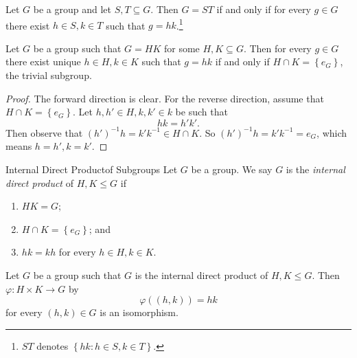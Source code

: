 \documentclass[pmath347]{subfiles}
\begin{document}
    \clearpage
    \begin{prop}{}
        Let $G$ be a group and let $S,T\subseteq G$. Then $G=ST$ if and only if for every $g\in G$ there exist $h\in S, k\in T$ such that $g=hk$.\footnote{$ST$ denotes $\left\lbrace hk:h\in S, k\in T \right\rbrace$.}
    \end{prop}

    \begin{prop}{}
        Let $G$ be a group such that $G=HK$ for some $H,K\subseteq G$. Then for every $g\in G$ there exist unique $h\in H,k\in K$ such that $g=hk$ if and only if $H\cap K = \left\lbrace e_G \right\rbrace$, the trivial subgroup.
    \end{prop}
    
    \begin{proof}
        The forward direction is clear. For the reverse direction, assume that $H\cap K = \left\lbrace e_G \right\rbrace$. Let $h,h'\in H, k,k'\in k$ be such that
        \begin{equation*}
            hk = h'k'.
        \end{equation*}
        Then observe that $\left( h' \right) ^{-1} h = k'k^{-1} \in H\cap K$. So $\left( h' \right) ^{-1} h = k'k^{-1} = e_G$, which means $h=h', k=k'$.
    \end{proof}
    
    \begin{definition}{Internal Direct Product}{of Subgroups}
        Let $G$ be a group. We say $G$ is the \emph{internal direct product} of $H,K\leq G$ if
        \begin{enumerate}
            \item $HK=G$;
            \item $H\cap K=\left\lbrace e_G \right\rbrace$; and
            \item $hk=kh$ for every $h\in H, k\in K$.
        \end{enumerate}
    \end{definition}

    \begin{theorem}{}
        Let $G$ be a group such that $G$ is the internal direct product of $H,K\leq G$. Then $\varphi:H\times K\to G$ by
        \begin{equation*}
            \varphi\left( \left( h,k \right)  \right) = hk
        \end{equation*}
        for every $\left( h,k \right) \in G$ is an isomorphism.
    \end{theorem}
\end{document}

